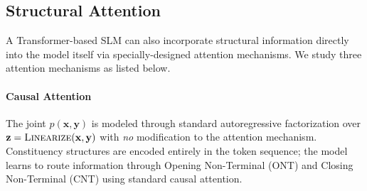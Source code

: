 \documentclass[11pt]{article}
\begin{document}
\subsection{Structural Attention}
\label{sec:structural_attn}

A Transformer-based SLM can also incorporate structural information directly into the model itself via specially-designed attention mechanisms. We study three attention mechanisms as listed below. 


\paragraph{Causal Attention} The joint $p(\mathbf{x}, \mathbf{y})$ is modeled through standard autoregressive factorization over $\mathbf{z} = \textsc{Linearize}(\mathbf{x}, \mathbf{y})$ with \textit{no} modification to the attention mechanism.
Constituency structures are encoded entirely in the token sequence; the model learns to route information through Opening Non-Terminal (ONT) and Closing Non-Terminal (CNT) using standard causal attention.

\end{document}
